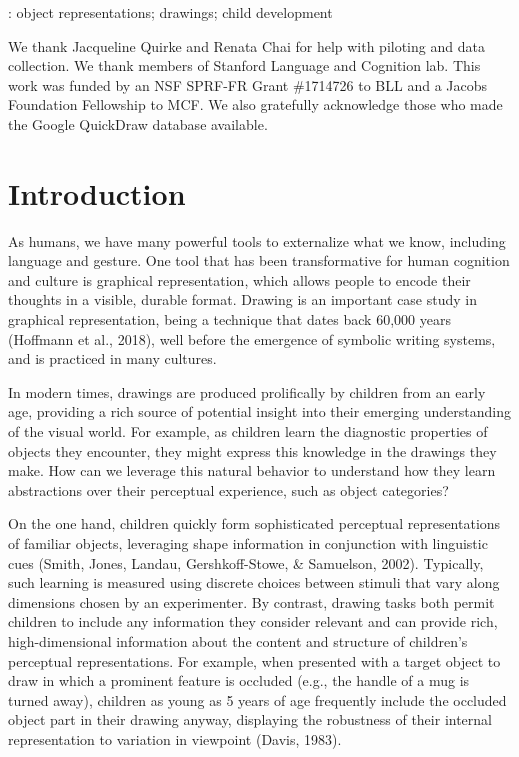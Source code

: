 \documentclass[10pt, letterpaper]{article}
\begin{document}
\vspace{2ex}

: object representations; drawings; child development

\vspace{2ex}


\vspace{1ex}

\noindent We thank Jacqueline Quirke and Renata Chai for help with piloting and
data collection. We thank members of Stanford Language and Cognition
lab. This work was funded by an NSF SPRF-FR Grant \#1714726 to BLL and a
Jacobs Foundation Fellowship to MCF. We also gratefully acknowledge
those who made the Google QuickDraw database available.

\clearpage

\twocolumn



\section{Introduction}\label{introduction}

As humans, we have many powerful tools to externalize what we know,
including language and gesture. One tool that has been transformative
for human cognition and culture is graphical representation, which
allows people to encode their thoughts in a visible, durable format.
Drawing is an important case study in graphical representation, being a
technique that dates back 60,000 years (Hoffmann et al., 2018), well
before the emergence of symbolic writing systems, and is practiced in
many cultures.

In modern times, drawings are produced prolifically by children from an
early age, providing a rich source of potential insight into their
emerging understanding of the visual world. For example, as children
learn the diagnostic properties of objects they encounter, they might
express this knowledge in the drawings they make. How can we leverage
this natural behavior to understand how they learn abstractions over
their perceptual experience, such as object categories?

On the one hand, children quickly form sophisticated perceptual
representations of familiar objects, leveraging shape information in
conjunction with linguistic cues (Smith, Jones, Landau, Gershkoff-Stowe,
\& Samuelson, 2002). Typically, such learning is measured using discrete
choices between stimuli that vary along dimensions chosen by an
experimenter. By contrast, drawing tasks both permit children to include
any information they consider relevant and can provide rich,
high-dimensional information about the content and structure of
children's perceptual representations. For example, when presented with
a target object to draw in which a prominent feature is occluded (e.g.,
the handle of a mug is turned away), children as young as 5 years of age
frequently include the occluded object part in their drawing anyway,
displaying the robustness of their internal representation to variation
in viewpoint (Davis, 1983).
\end{document}
